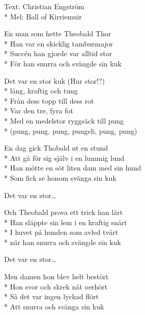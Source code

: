 \begin{SongText}
\begin{SongInfo}
    Text: Christian Engström\\*%
    Mel: Ball of Kirriemuir
\end{SongInfo}
\begin{SongVerse}
En man som hette Theobald Thor\\*%
Han var en skicklig tamburmajor\\*%
Succén han gjorde var alltid stor\\*%
För han snurra och svängde sin kuk
\end{SongVerse}
\begin{SongVerse}
Det var en stor kuk (Hur stor!?)\\*%
lång, kraftig och tung\\*%
Från dess topp till dess rot\\*%
Var den tre, fyra fot\\*%
Med en medelstor ryggsäck till pung\\*%
(pung, pung, pung, pungeli,  pung, pung)
\end{SongVerse}
\begin{SongVerse}
En dag gick Thobald ut en stund\\*%
Att gå för sig själv i en lummig lund\\*%
Han mötte en söt liten dam med sin hund\\*%
Som fick se honom svänga sin kuk
\end{SongVerse}
\begin{SongVerse}
Det var en stor…
\end{SongVerse}
\begin{SongVerse}
Och Theobald prova ett trick han lärt\\*%
Han släppte sin lem i en kraftig snärt\\*%
I huvet på hunden som avled tvärt\\*%
när han snurra och svängde sin kuk
\end{SongVerse}
\begin{SongVerse}
Det var en stor…
\end{SongVerse}
\begin{SongVerse}
Men damen hon blev helt bestört\\*%
Hon svor och skrek nåt oerhört\\*%
Så det var ingen lyckad flört\\*%
Att snurra och svänga sin kuk
\end{SongVerse}

\end{SongText}
